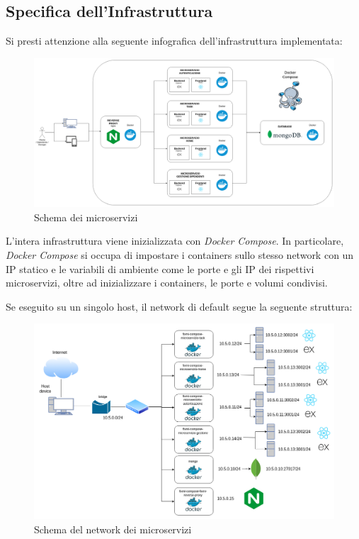 \documentclass{report}
\begin{document}
\subsection{Specifica dell'Infrastruttura}

Si presti attenzione alla seguente infografica dell'infrastruttura implementata:

\begin{figure}[H]
	\centering\includegraphics[width=1\textwidth]{images/diagramma_microservizi.png}
	Schema dei microservizi
\end{figure}

L'intera infrastruttura viene inizializzata con \textit{Docker Compose}. In particolare, \textit{Docker Compose} si occupa di impostare i containers sullo stesso network con un IP statico e le variabili di ambiente come le porte e gli IP dei rispettivi microservizi, oltre ad inizializzare i containers, le porte e volumi condivisi.

Se eseguito su un singolo host, il network di default segue la seguente struttura:
\begin{figure}[H]
	\centering\includegraphics[width=1\textwidth]{images/network.png}
	Schema del network dei microservizi
\end{figure}
\end{document}
